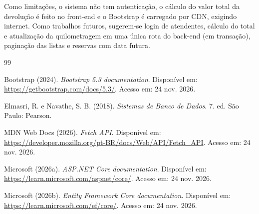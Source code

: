 \documentclass[12pt]{article}
\begin{document}
Como limitações, o sistema não tem autenticação, o cálculo do valor total da devolução é feito no
front-end e o Bootstrap é carregado por CDN, exigindo internet. Como trabalhos futuros, sugerem-se
login de atendentes, cálculo do total e atualização da quilometragem em uma única rota do
back-end (em transação), paginação das listas e reservas com data futura.

\begin{thebibliography}{99}

Bootstrap (2024). \emph{Bootstrap 5.3 documentation}. Disponível em:
\url{https://getbootstrap.com/docs/5.3/}. Acesso em: 24 nov. 2026.

Elmasri, R. e Navathe, S. B. (2018). \emph{Sistemas de Banco de Dados}. 7. ed. São Paulo: Pearson.

MDN Web Docs (2026). \emph{Fetch API}. Disponível em:
\url{https://developer.mozilla.org/pt-BR/docs/Web/API/Fetch_API}. Acesso em: 24 nov. 2026.

Microsoft (2026a). \emph{ASP.NET Core documentation}. Disponível em:
\url{https://learn.microsoft.com/aspnet/core/}. Acesso em: 24 nov. 2026.

Microsoft (2026b). \emph{Entity Framework Core documentation}. Disponível em:
\url{https://learn.microsoft.com/ef/core/}. Acesso em: 24 nov. 2026.

\end{thebibliography}
\end{document}
